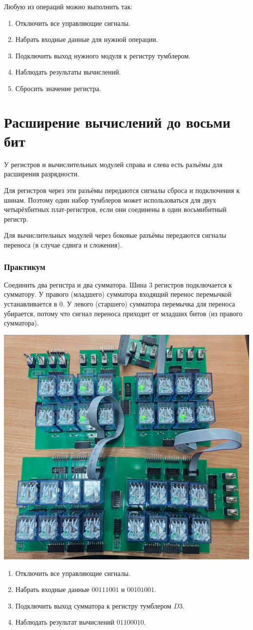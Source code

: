 Любую из операций можно выполнить так:

\begin{enumerate}
    \item Отключить все управляющие сигналы.
    \item Набрать входные данные для нужной операции.
    \item Подключить выход нужного модуля к регистру тумблером.
    \item Наблюдать результаты вычислений.
    \item Сбросить значение регистра.
\end{enumerate}


\section{Расширение вычислений до восьми бит}

У регистров и вычислительных модулей справа и слева есть разъёмы для расширения разрядности.

Для регистров через эти разъёмы передаются сигналы сброса и подключения к шинам. Поэтому
один набор тумблеров может использоваться для двух четырёхбитных плат-регистров, если они
соединены в один восьмибитный регистр.

Для вычислительных модулей через боковые разъёмы передаются сигналы переноса (в случае сдвига и сложения).

\subsubsection{Практикум}

Соединить два регистра и два сумматора. Шина $3$ регистров подключается к сумматору.
У правого (младшего) сумматора входящий перенос перемычкой устанавливается в $0$.
У левого (старшего) сумматора перемычка для переноса убирается, потому что
сигнал переноса приходит от младших битов (из правого сумматора).

\includegraphics[width=0.5\columnwidth]{photo/8bit.jpg}

\begin{enumerate}
    \item Отключить все управляющие сигналы.
    \item Набрать входные данные $0011 1001$ и $0010 1001$.
    \item Подключить выход сумматора к регистру тумблером $D3$.
    \item Наблюдать результат вычислений $0110 0010$.
\end{enumerate}

